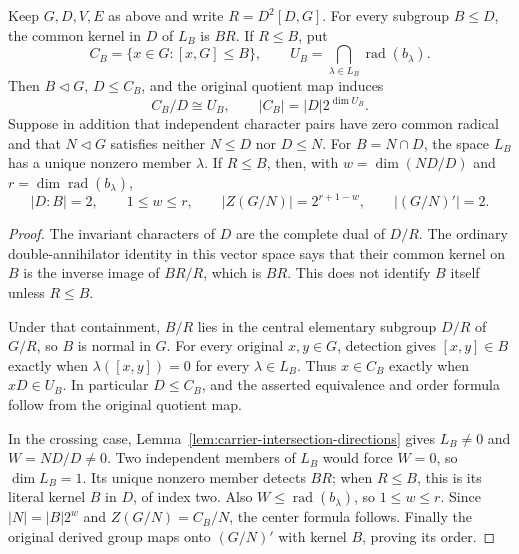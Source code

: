 \begin{lemma}
\label{lem:carrier-annihilator-center}
Keep $G,D,V,E$ as above and write $R=D^2[D,G]$.
For every subgroup $B\leq D$, the common kernel in $D$ of $L_B$
is $BR$. If $R\leq B$, put
\[
 C_B=\{x\in G:[x,G]\leq B\},\qquad
 U_B=\bigcap_{\lambda\in L_B}\operatorname{rad}(b_\lambda).
\]
Then $B\lhd G$, $D\leq C_B$, and the original quotient map induces
\[
 C_B/D\cong U_B,\qquad |C_B|=|D|2^{\dim U_B}.
\]
Suppose in addition that independent character pairs have zero common
radical and that $N\lhd G$ satisfies neither $N\leq D$ nor $D\leq N$.
For $B=N\cap D$, the space $L_B$ has a unique nonzero member
$\lambda$. If $R\leq B$, then, with
$w=\dim(ND/D)$ and $r=\dim\operatorname{rad}(b_\lambda)$,
\begin{equation}\label{eq:carrier-crossing-center}
 |D:B|=2,\qquad 1\leq w\leq r,\qquad
 |Z(G/N)|=2^{r+1-w},\qquad |(G/N)'|=2.
\end{equation}
\end{lemma}
\begin{proof}
The invariant characters of $D$ are the complete dual of $D/R$.
The ordinary double-annihilator identity in this vector space says
that their common kernel on $B$ is the inverse image of $BR/R$,
which is $BR$. This does not identify $B$ itself unless $R\leq B$.

Under that containment, $B/R$ lies in the central elementary subgroup
$D/R$ of $G/R$, so $B$ is normal in $G$.
For every original $x,y\in G$, detection gives
$[x,y]\in B$ exactly when $\lambda([x,y])=0$ for every
$\lambda\in L_B$. Thus $x\in C_B$ exactly when $xD\in U_B$.
In particular $D\leq C_B$, and the asserted equivalence and order
formula follow from the original quotient map.

In the crossing case, Lemma~\ref{lem:carrier-intersection-directions}
gives $L_B\ne0$ and $W=ND/D\ne0$. Two independent members of $L_B$
would force $W=0$, so $\dim L_B=1$. Its unique nonzero member
detects $BR$; when $R\leq B$, this is its literal kernel $B$ in $D$,
of index two. Also $W\leq\operatorname{rad}(b_\lambda)$, so
$1\leq w\leq r$. Since $|N|=|B|2^w$ and
$Z(G/N)=C_B/N$, the center formula follows. Finally the original
derived group maps onto $(G/N)'$ with kernel $B$, proving its order.
\end{proof}

